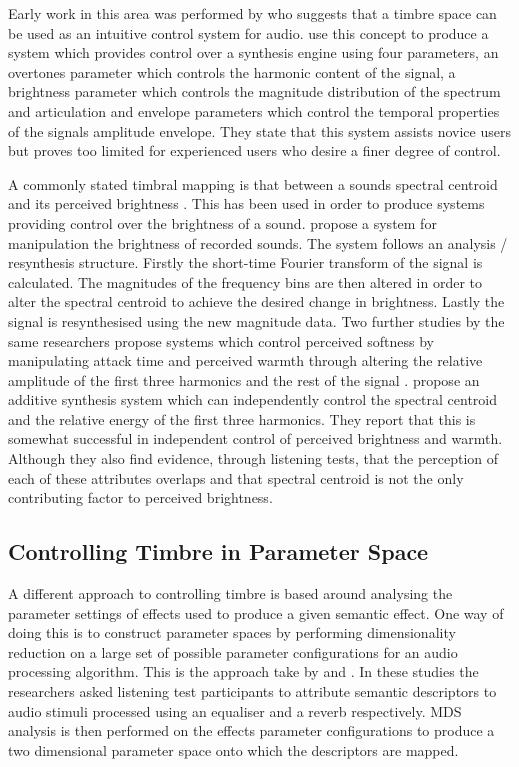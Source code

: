 		Early work in this area was performed by \citet{wessel1979timbre} who suggests that a timbre space can be
		used as an intuitive control system for audio. \citet{vertegaal1994isee} use this concept to produce a
		system which provides control over a synthesis engine using four parameters, an overtones parameter which
		controls the harmonic content of the signal, a brightness parameter which controls the magnitude
		distribution of the spectrum and articulation and envelope parameters which control the temporal properties
		of the signals amplitude envelope. They state that this system assists novice users but proves too limited
		for experienced users who desire a finer degree of control.

		A commonly stated timbral mapping is that between a sounds spectral centroid and its perceived brightness
		\citep{schubert2006does}. This has been used in order to produce systems providing control over the
		brightness of a sound. \citet{williams2007perceptually} propose a system for manipulation the brightness of
		recorded sounds. The system follows an analysis / resynthesis structure. Firstly the short-time Fourier
		transform of the signal is calculated. The magnitudes of the frequency bins are then altered in order to
		alter the spectral centroid to achieve the desired change in brightness. Lastly the signal is resynthesised
		using the new magnitude data.  Two further studies by the same researchers propose systems which control
		perceived softness by manipulating attack time \citep{williams2009perceptually} and perceived warmth
		through altering the relative amplitude of the first three harmonics and the rest of the signal
		\citep{williams2010perceptually}. \citet{zacharakis2011an} propose an additive synthesis system which can
		independently control the spectral centroid and the relative energy of the first three harmonics. They
		report that this is somewhat successful in independent control of perceived brightness and warmth. Although
		they also find evidence, through listening tests, that the perception of each of these attributes overlaps
		and that spectral centroid is not the only contributing factor to perceived brightness.

	\subsection{Controlling Timbre in Parameter Space}
	\label{sec:Timbre-Control-ParameterSpaces}
		A different approach to controlling timbre is based around analysing the parameter settings of effects used
		to produce a given semantic effect. One way of doing this is to construct parameter spaces by performing
		dimensionality reduction on a large set of possible parameter configurations for an audio processing
		algorithm. This is the approach take by \citet{cartwright2013socialeq} and
		\citet{seetharaman2014crowdsourcing}. In these studies the researchers asked listening test participants to
		attribute semantic descriptors to audio stimuli processed using an equaliser and a reverb respectively. MDS
		analysis is then performed on the effects parameter configurations to produce a two dimensional parameter
		space onto which the descriptors are mapped.

